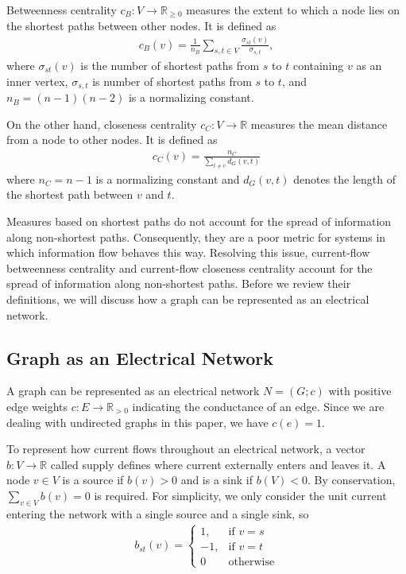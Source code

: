 \documentclass[10pt]{siamltex}
\begin{document}
\begin{pagewiselinenumbers}
Betweenness centrality \cite{booknewman, brandes2005centrality} $c_B: V \rightarrow \mathbb{R}_{\geq 0}$ measures the extent to which a node lies on the shortest paths between other nodes. It is defined as 
\begin{align}
c_B(v) = \frac{1}{n_B} \sum_{s,t \in V} \frac{\sigma_{st}(v)}{\sigma_{s,t}},
\end{align}
where $\sigma_{st}(v)$ is the number of shortest paths from $s$ to $t$ containing $v$ as an inner vertex, $\sigma_{s,t}$ is number of shortest paths from $s$ to $t$, and $n_B = (n-1)(n-2)$ is a normalizing constant.



On the other hand, closeness centrality $c_C: V \rightarrow \mathbb{R}$ \cite{booknewman, brandes2005centrality} measures the mean distance from a node to other nodes. It is defined as 
\begin{align}
c_{C}(v)=\frac{n_{C}}{\sum\limits_{t\neq v} d_{G}(v,t)}
\end{align}
where $n_C = n-1$ is a normalizing constant and
$d_{G}(v,t)$ denotes the length of the shortest path between $v$ and $t$.
     
     Measures based on shortest paths do not account for the spread of information along non-shortest paths. Consequently, they are a poor metric for systems in which information flow behaves this way. Resolving this issue, current-flow betweenness centrality and current-flow closeness centrality account for the spread of information along non-shortest paths. Before we review their definitions, we will discuss how a graph can be represented as an electrical network.
     \subsection{Graph as an Electrical Network \cite{brandes2005centrality}} A graph can be represented as an electrical network $N = (G;c)$ with positive edge weights $c: E \rightarrow \mathbb{R}_{> 0}$ indicating the conductance of an edge. Since we are dealing with undirected graphs in this paper, we have $c(e) = 1$.
     
     To represent how current flows throughout an electrical network, a vector $b: V \rightarrow \mathbb{R}$ called supply defines where current externally enters and leaves it. A node $v \in V$ is a source if $b(v) > 0$ and is a sink if $b(V) < 0$. By conservation, $\sum_{v \in V} b(v) = 0$ is required. For simplicity, we only consider the unit current entering the network with a single source and a single sink, so 
        \begin{align*}
     b_{st}(v) =
\begin{cases}
1, & \text{if }v=s 
\\
-1, & \text{if }v=t
\\
0 & \text{otherwise}
\end{cases}
     \end{align*}


\end{pagewiselinenumbers}
\end{document}
